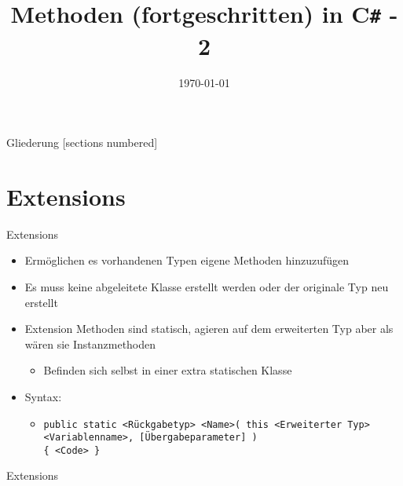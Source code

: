



\title{Methoden (fortgeschritten) in C\texttt{\#} - 2}
\date{\today}




\maketitle

\begin{frame}{Gliederung}
	[sections numbered]
	\tableofcontents
\end{frame}

\section{Extensions}
\begin{frame}{Extensions}
	\begin{itemize}
		\item Ermöglichen es vorhandenen Typen eigene Methoden hinzuzufügen
		\item Es muss keine abgeleitete Klasse erstellt werden oder der originale Typ neu erstellt
		\item Extension Methoden sind statisch, agieren auf dem erweiterten Typ aber als wären sie Instanzmethoden
		\begin{itemize}
			\item Befinden sich selbst in einer extra statischen Klasse
		\end{itemize}				
		\item Syntax:
		\begin{itemize}
			\item \texttt{public static \alert{<Rückgabetyp> <Name>}( this \alert{<Erweiterter Typ> <Variablenname>}, \alert{[Übergabeparameter]} )\\ \{ \alert{<Code>} \}}
		\end{itemize}
	\end{itemize}
\end{frame}

\begin{frame}{Extensions}
	
\end{frame}

